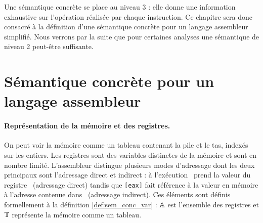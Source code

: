 Une sémantique concrète se place au niveau 3 : elle donne une information exhaustive sur l'opération réalisée par chaque instruction.
Ce chapitre sera donc consacré à la définition d'une sémantique concrète pour un langage assembleur simplifié.
Nous verrons par la suite que pour certaines analyses une sémantique de niveau 2 peut-être suffisante.

\section{Sémantique concrète pour un langage assembleur}
\paragraph{Représentation de la mémoire et des registres.}
On peut voir la mémoire comme un tableau contenant la pile et le tas, indexés sur les entiers. Les registres sont des variables distinctes de la mémoire et sont en nombre limité.
L'assembleur distingue plusieurs modes d'adressage dont les deux principaux sont l'adressage direct et indirect : à l'exécution \eax\ prend la valeur du registre \eax\ (adressage direct) tandis que \texttt{[eax]} fait référence à la valeur en mémoire à l'adresse contenue dans \eax\ (adressage indirect).
Ces éléments sont définis formellement à la définition \ref{def:sem_conc_var} : $\mathbb A$ est l'ensemble des registres et $\mathbb T$ représente la mémoire comme un tableau.




